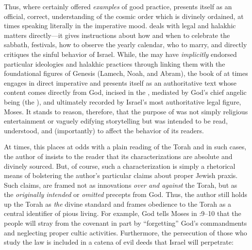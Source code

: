 Thus, where \ga certainly offered \emph{examples} of good practice, \jub presents itself as an official, correct, understanding of the cosmic order which is divinely ordained, at times speaking literally in the imperative mood. \jub deals with legal and halakhic matters directly---it gives instructions about how and when to celebrate the sabbath, festivals, how to observe the yearly calendar, who to marry, and directly critiques the sinful behavior of Israel. While, the \ga may have \emph{implicitly} endorsed particular ideologies and halakhic practices through linking them with the foundational figures of Genesis (Lamech, Noah, and Abram), the book of \jub at times engages in direct imperative and presents itself as an authoritative text whose content comes directly from God, incised in the \heavenlytablets, mediated by God's chief angelic being (the \ap), and ultimately recorded by Israel's most authoritative legal figure, Moses. It stands to reason, therefore, that the purpose of \jub was not simply religious entertainment or vaguely edifying storytelling but was intended to be read, understood, and (importantly) to affect the behavior of its readers.

At times, this places \jub at odds with a plain reading of the Torah and in such cases, the author of \jub insists to the reader that its characterizations are absolute and divinely sourced. But, of course, such a characterization is simply a rhetorical means of bolstering the author's particular claims about proper Jewish praxis. Such claims, are framed not as innovations \emph{over and against} the Torah, but as the \emph{originally intended} or \emph{omitted} precepts from God. Thus, the author still holds up the Torah as \emph{the} divine standard and frames obedience to the Torah as a central identifier of pious living. For example, God tells Moses in :9--10 that the people will stray from the covenant in part by ``forgetting'' God's commandments and neglecting proper cultic activities. Furthermore, the persecution of those who study the law is included in a catena of evil deeds that Israel will perpetrate:



